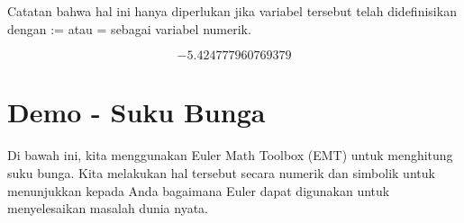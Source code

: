 \documentclass{article}
\newenvironment{eulernotebook}{\par}{\par}
\newcommand{\eulerheading}[1]{\section{#1}}
\newenvironment{eulercomment}{\par\medskip}{\par\medskip}
\newenvironment{eulerformula}{}{}
\begin{document}
\begin{eulernotebook}
\begin{eulercomment}
\begin{eulercomment}
\begin{eulercomment}
\begin{eulercomment}
\begin{eulercomment}
\begin{eulercomment}
\begin{eulercomment}
Catatan bahwa hal ini hanya diperlukan jika variabel tersebut telah
didefinisikan dengan := atau = sebagai variabel numerik.
\end{eulercomment}
\begin{eulerformula}
\[
-5.424777960769379
\]
\end{eulerformula}
\begin{eulercomment}
\begin{eulercomment}
\eulerheading{Demo - Suku Bunga}
\begin{eulercomment}
Di bawah ini, kita menggunakan Euler Math Toolbox (EMT) untuk
menghitung suku bunga. Kita melakukan hal tersebut secara numerik dan
simbolik untuk menunjukkan kepada Anda bagaimana Euler dapat digunakan
untuk menyelesaikan masalah dunia nyata.


\end{eulercomment}
\end{eulercomment}
\end{eulercomment}
\end{eulercomment}
\end{eulercomment}
\end{eulercomment}
\end{eulercomment}
\end{eulercomment}
\end{eulercomment}
\end{eulernotebook}
\end{document}
